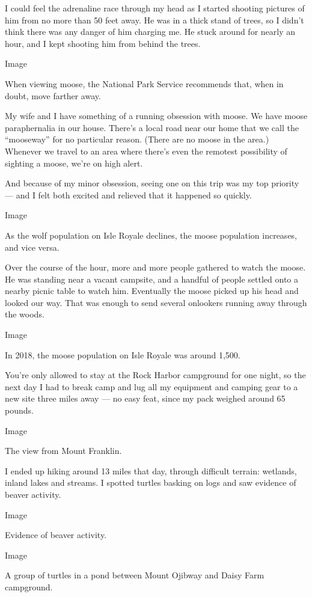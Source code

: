 I could feel the adrenaline race through my head as I started shooting
pictures of him from no more than 50 feet away. He was in a thick stand
of trees, so I didn't think there was any danger of him charging me. He
stuck around for nearly an hour, and I kept shooting him from behind the
trees.

Image

When viewing moose, the National Park Service recommends that, when in
doubt, move farther away.

My wife and I have something of a running obsession with moose. We have
moose paraphernalia in our house. There's a local road near our home
that we call the ``mooseway'' for no particular reason. (There are no
moose in the area.) Whenever we travel to an area where there's even the
remotest possibility of sighting a moose, we're on high alert.

And because of my minor obsession, seeing one on this trip was my top
priority --- and I felt both excited and relieved that it happened so
quickly.

Image

As the wolf population on Isle Royale declines, the moose population
increases, and vice versa.

Over the course of the hour, more and more people gathered to watch the
moose. He was standing near a vacant campsite, and a handful of people
settled onto a nearby picnic table to watch him. Eventually the moose
picked up his head and looked our way. That was enough to send several
onlookers running away through the woods.

Image

In 2018, the moose population on Isle Royale was around 1,500.

You're only allowed to stay at the Rock Harbor campground for one night,
so the next day I had to break camp and lug all my equipment and camping
gear to a new site three miles away --- no easy feat, since my pack
weighed around 65 pounds.

Image

The view from Mount Franklin.

I ended up hiking around 13 miles that day, through difficult terrain:
wetlands, inland lakes and streams. I spotted turtles basking on logs
and saw evidence of beaver activity.

Image

Evidence of beaver activity.

Image

A group of turtles in a pond between Mount Ojibway and Daisy Farm
campground.

